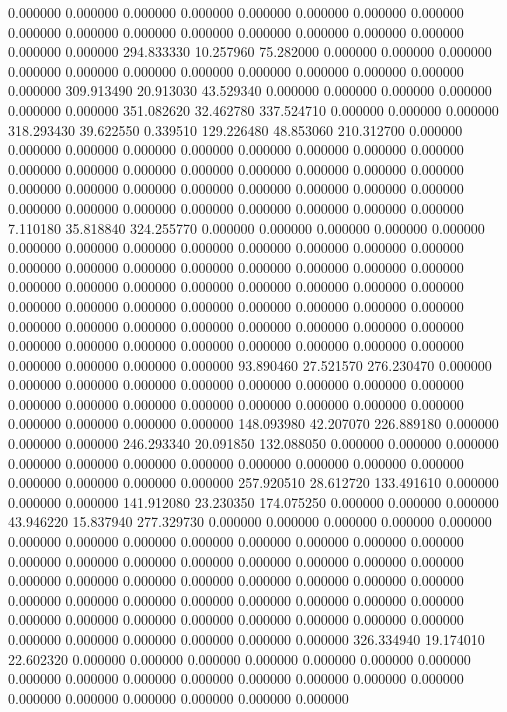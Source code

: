0.000000 0.000000 0.000000
0.000000 0.000000 0.000000
0.000000 0.000000 0.000000
0.000000 0.000000 0.000000
0.000000 0.000000 0.000000
0.000000 0.000000 0.000000
294.833330 10.257960 75.282000
0.000000 0.000000 0.000000
0.000000 0.000000 0.000000
0.000000 0.000000 0.000000
0.000000 0.000000 0.000000
309.913490 20.913030 43.529340
0.000000 0.000000 0.000000
0.000000 0.000000 0.000000
351.082620 32.462780 337.524710
0.000000 0.000000 0.000000
318.293430 39.622550 0.339510
129.226480 48.853060 210.312700
0.000000 0.000000 0.000000
0.000000 0.000000 0.000000
0.000000 0.000000 0.000000
0.000000 0.000000 0.000000
0.000000 0.000000 0.000000
0.000000 0.000000 0.000000
0.000000 0.000000 0.000000
0.000000 0.000000 0.000000
0.000000 0.000000 0.000000
0.000000 0.000000 0.000000
0.000000 0.000000 0.000000
7.110180 35.818840 324.255770
0.000000 0.000000 0.000000
0.000000 0.000000 0.000000
0.000000 0.000000 0.000000
0.000000 0.000000 0.000000
0.000000 0.000000 0.000000
0.000000 0.000000 0.000000
0.000000 0.000000 0.000000
0.000000 0.000000 0.000000
0.000000 0.000000 0.000000
0.000000 0.000000 0.000000
0.000000 0.000000 0.000000
0.000000 0.000000 0.000000
0.000000 0.000000 0.000000
0.000000 0.000000 0.000000
0.000000 0.000000 0.000000
0.000000 0.000000 0.000000
0.000000 0.000000 0.000000
0.000000 0.000000 0.000000
0.000000 0.000000 0.000000
93.890460 27.521570 276.230470
0.000000 0.000000 0.000000
0.000000 0.000000 0.000000
0.000000 0.000000 0.000000
0.000000 0.000000 0.000000
0.000000 0.000000 0.000000
0.000000 0.000000 0.000000
0.000000 0.000000 0.000000
148.093980 42.207070 226.889180
0.000000 0.000000 0.000000
246.293340 20.091850 132.088050
0.000000 0.000000 0.000000
0.000000 0.000000 0.000000
0.000000 0.000000 0.000000
0.000000 0.000000 0.000000
0.000000 0.000000 0.000000
257.920510 28.612720 133.491610
0.000000 0.000000 0.000000
141.912080 23.230350 174.075250
0.000000 0.000000 0.000000
43.946220 15.837940 277.329730
0.000000 0.000000 0.000000
0.000000 0.000000 0.000000
0.000000 0.000000 0.000000
0.000000 0.000000 0.000000
0.000000 0.000000 0.000000
0.000000 0.000000 0.000000
0.000000 0.000000 0.000000
0.000000 0.000000 0.000000
0.000000 0.000000 0.000000
0.000000 0.000000 0.000000
0.000000 0.000000 0.000000
0.000000 0.000000 0.000000
0.000000 0.000000 0.000000
0.000000 0.000000 0.000000
0.000000 0.000000 0.000000
0.000000 0.000000 0.000000
0.000000 0.000000 0.000000
326.334940 19.174010 22.602320
0.000000 0.000000 0.000000
0.000000 0.000000 0.000000
0.000000 0.000000 0.000000
0.000000 0.000000 0.000000
0.000000 0.000000 0.000000
0.000000 0.000000 0.000000
0.000000 0.000000 0.000000
